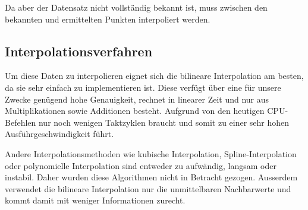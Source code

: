 Da aber der Datensatz nicht vollständig bekannt ist, muss zwischen den bekannten
und ermittelten Punkten interpoliert werden.

\subsection{Interpolationsverfahren}
Um diese Daten zu interpolieren eignet sich die bilineare Interpolation am
besten, da sie sehr einfach zu implementieren ist. Diese verfügt über eine für
unsere Zwecke genügend hohe Genauigkeit, rechnet in linearer Zeit und nur aus
Multiplikationen sowie Additionen besteht. Aufgrund von den heutigen
CPU-Befehlen nur noch wenigen Taktzyklen braucht und somit zu einer sehr hohen
Ausführgeschwindigkeit führt.

Andere Interpolationsmethoden wie kubische Interpolation, Spline-Interpolation
oder polynomielle Interpolation sind entweder zu aufwändig, langsam oder
instabil. Daher wurden diese Algorithmen nicht in Betracht gezogen. Ausserdem
verwendet die bilineare Interpolation nur die unmittelbaren Nachbarwerte und
kommt damit mit weniger Informationen zurecht.
